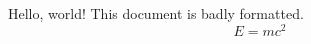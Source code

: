\documentclass{article}
\begin{document}
Hello,   world!   This document   is    badly formatted.
$$E=mc^2$$
\end{document}
